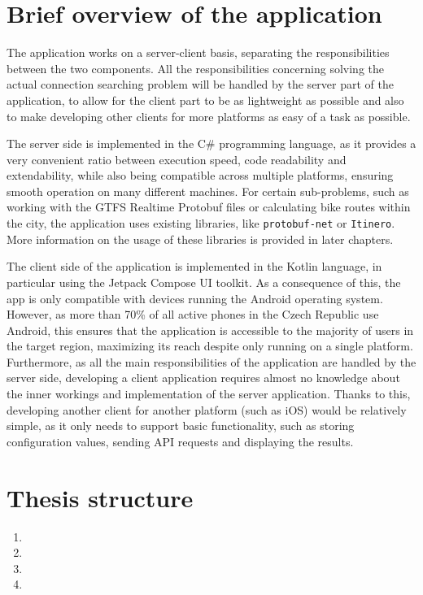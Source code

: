 \section{Brief overview of the application}

The application works on a server-client basis, separating the responsibilities between the two components. All the responsibilities concerning solving the actual connection searching problem will be handled by the server part of the application, to allow for the client part to be as lightweight as possible and also to make developing other clients for more platforms as easy of a task as possible.

The server side is implemented in the C\# programming language, as it provides a very convenient ratio between execution speed, code readability and extendability, while also being compatible across multiple platforms, ensuring smooth operation on many different machines. For certain sub-problems, such as working with the GTFS Realtime Protobuf files or calculating bike routes within the city, the application uses existing libraries, like \texttt{protobuf-net} or \texttt{Itinero}. More information on the usage of these libraries is provided in later chapters.

The client side of the application is implemented in the Kotlin language, in particular using the Jetpack Compose UI toolkit. As a consequence of this, the app is only compatible with devices running the Android operating system. However, as more than 70\% of all active phones in the Czech Republic use Android\cite{statista_mobile_os}, this ensures that the application is accessible to the majority of users in the target region, maximizing its reach despite only running on a single platform. Furthermore, as all the main responsibilities of the application are handled by the server side, developing a client application requires almost no knowledge about the inner workings and implementation of the server application. Thanks to this, developing another client for another platform (such as iOS) would be relatively simple, as it only needs to support basic functionality, such as storing configuration values, sending API requests and displaying the results.

\section{Thesis structure}
\begin{enumerate}
    \item {}
    \item {}
    \item {}
    \item {}
\end{enumerate}
\xxx{}

